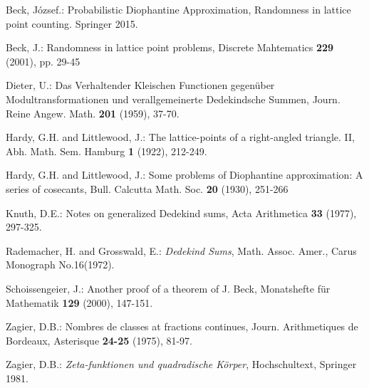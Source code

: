 \documentclass[11pt,a4paper]{article}
\newcommand{\wuhao}{\fontsize{10.5pt}{18pt}\selectfont}
\newcommand\seccontent{
	\wuhao %
    \setlength{\parindent}{2em} %
    \setlength{\parskip}{0pt}
    }
\theoremstyle{definition}
\numberwithin{equation}{section}
\begin{document}
	\appendix
    
    	
	\begin{thebibliography}{2}
	\label{thereferes}		
	 \seccontent
	 Beck, J\'ozsef.: Probabilistic Diophantine Approximation, Randomness in lattice point counting. Springer 2015.
	  
	 Beck, J.: Randomness in lattice point problems, Discrete Mahtematics \textbf{229} (2001), pp. 29-45
	 
	 Dieter, U.: Das Verhaltender Kleischen Functionen gegen\"uber Modultransformationen und verallgemeinerte Dedekindsche Summen, Journ. Reine Angew. Math. \textbf{201} (1959), 37-70.
	 
	 Hardy, G.H. and Littlewood, J.: The lattice-points of a right-angled triangle. II, Abh. Math. Sem. Hamburg \textbf{1} (1922), 212-249.
	 
	 Hardy, G.H. and Littlewood, J.: Some problems of Diophantine approximation: A series of cosecants, Bull. Calcutta Math. Soc. \textbf{20} (1930), 251-266
	 
	 Knuth, D.E.: Notes on generalized Dedekind sums, Acta Arithmetica \textbf{33} (1977), 297-325.
	 
	 Rademacher, H. and Grosswald, E.: \textit{Dedekind Sums}, Math. Assoc. Amer., Carus Monograph No.16(1972).
	 
	 Schoissengeier, J.: Another proof of a theorem of J. Beck, Monatshefte f\"ur Mathematik \textbf{129} (2000), 147-151.
	 
	  Zagier, D.B.: Nombres de classes at fractions continues, Journ. Arithmetiques de Bordeaux, Asterisque \textbf{24-25} (1975), 81-97.
	 
	  Zagier, D.B.: \textit{Zeta-funktionen und quadradische K\"orper}, Hochschultext, Springer 1981.

	\end{thebibliography}
%	
\end{document}
